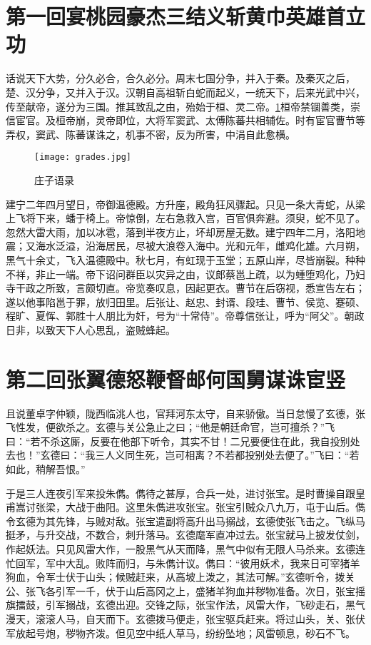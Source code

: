    \section{第一回\hspace{0.5em}宴桃园豪杰三结义\hspace{0.5em}斩黄巾英雄首立功}
        话说天下大势，分久必合，合久必分。周末七国分争，并入于秦。及秦灭之后，楚、汉分争，又并入于汉。汉朝自高祖斩白蛇而起义，一统天下，后来光武中兴，传至献帝，遂分为三国。推其致乱之由，殆始于桓、灵二帝。\ref{fig:one}桓帝禁锢善类，崇信宦官。及桓帝崩，灵帝即位，大将军窦武、太傅陈蕃共相辅佐。时有宦官曹节等弄权，窦武、陈蕃谋诛之，机事不密，反为所害，中涓自此愈横。
        \begin{figure}[h]
            \centering
            \texttt{[image: grades.jpg]}
            \caption{庄子语录}
            \label{fig:one}
        \end{figure}
        建宁二年四月望日，帝御温德殿。方升座，殿角狂风骤起。只见一条大青蛇，从梁上飞将下来，蟠于椅上。帝惊倒，左右急救入宫，百官俱奔避。须臾，蛇不见了。忽然大雷大雨，加以冰雹，落到半夜方止，坏却房屋无数。建宁四年二月，洛阳地震；又海水泛溢，沿海居民，尽被大浪卷入海中。光和元年，雌鸡化雄。六月朔，黑气十余丈，飞入温德殿中。秋七月，有虹现于玉堂；五原山岸，尽皆崩裂。种种不祥，非止一端。帝下诏问群臣以灾异之由，议郎蔡邕上疏，以为蝩堕鸡化，乃妇寺干政之所致，言颇切直。帝览奏叹息，因起更衣。曹节在后窃视，悉宣告左右；遂以他事陷邕于罪，放归田里。后张让、赵忠、封谞、段珪、曹节、侯览、蹇硕、程旷、夏恽、郭胜十人朋比为奸，号为“十常侍”。帝尊信张让，呼为“阿父”。朝政日非，以致天下人心思乱，盗贼蜂起。
    \section{第二回\hspace{0.5em}张翼德怒鞭督邮\hspace{0.5em}何国舅谋诛宦竖}
        且说董卓字仲颖，陇西临洮人也，官拜河东太守，自来骄傲。当日怠慢了玄德，张飞性发，便欲杀之。玄德与关公急止之曰；“他是朝廷命官，岂可擅杀？”飞曰：“若不杀这厮，反要在他部下听令，其实不甘！二兄要便住在此，我自投别处去也！”玄德曰：“我三人义同生死，岂可相离？不若都投别处去便了。”飞曰：“若如此，稍解吾恨。”

        于是三人连夜引军来投朱儁。儁待之甚厚，合兵一处，进讨张宝。是时曹操自跟皇甫嵩讨张梁，大战于曲阳。这里朱儁进攻张宝。张宝引贼众八九万，屯于山后。儁令玄德为其先锋，与贼对敌。张宝遣副将高升出马搦战，玄德使张飞击之。飞纵马挺矛，与升交战，不数合，刺升落马。玄德麾军直冲过去。张宝就马上披发仗剑，作起妖法。只见风雷大作，一股黑气从天而降，黑气中似有无限人马杀来。玄德连忙回军，军中大乱。败阵而归，与朱儁计议。儁曰：“彼用妖术，我来日可宰猪羊狗血，令军士伏于山头；候贼赶来，从高坡上泼之，其法可解。”玄德听令，拨关公、张飞各引军一千，伏于山后高冈之上，盛猪羊狗血并秽物准备。次日，张宝摇旗擂鼓，引军搦战，玄德出迎。交锋之际，张宝作法，风雷大作，飞砂走石，黑气漫天，滚滚人马，自天而下。玄德拨马便走，张宝驱兵赶来。将过山头，关、张伏军放起号炮，秽物齐泼。但见空中纸人草马，纷纷坠地；风雷顿息，砂石不飞。

